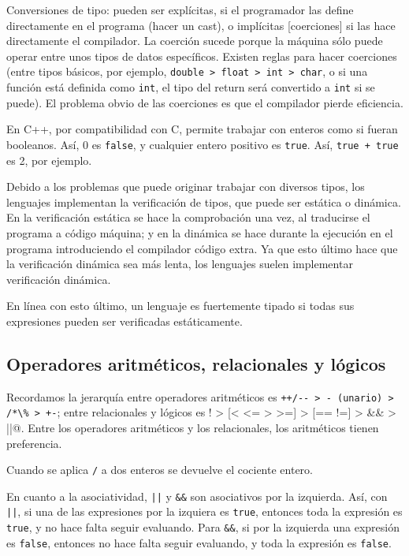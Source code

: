 \documentclass[a4paper]{article}
\begin{document}
	Conversiones de tipo: pueden ser explícitas, si el programador las define directamente en el programa (hacer un cast), o implícitas [coerciones] si las hace directamente el compilador. La coerción sucede porque la máquina sólo puede operar entre unos tipos de datos específicos. Existen reglas para hacer coerciones (entre tipos básicos, por ejemplo, \verb!double > float > int > char!, o si una función está definida como \verb|int|, el tipo del return será convertido a \verb|int| si se puede). El problema obvio de las coerciones es que el compilador pierde eficiencia.
	
	En C++, por compatibilidad con C, permite trabajar con enteros como si fueran booleanos. Así, 0 es \verb|false|, y cualquier entero positivo es \verb|true|. Así, \verb|true + true| es 2, por ejemplo.
	
	Debido a los problemas que puede originar trabajar con diversos tipos, los lenguajes implementan la verificación de tipos, que puede ser estática o dinámica. En la verificación estática se hace la comprobación una vez, al traducirse el programa a código máquina; y en la dinámica se hace durante la ejecución en el programa introduciendo el compilador código extra. Ya que esto último hace que la verificación dinámica sea más lenta, los lenguajes suelen implementar verificación dinámica. 
	
	En línea con esto último, un lenguaje es fuertemente tipado si todas sus expresiones pueden ser verificadas estáticamente.
	
	
	\subsection{Operadores aritméticos, relacionales y lógicos}
	Recordamos la jerarquía entre operadores aritméticos es \verb|++/-- > - (unario) > /*\% > +-|; entre relacionales y lógicos es \verb@! > [< <= > >=] > [== !=] > && > ||@. Entre los operadores aritméticos y los relacionales, los aritméticos tienen preferencia.
	
	Cuando se aplica \verb|/| a dos enteros se devuelve el cociente entero.
	
	En cuanto a la asociatividad, \verb!||! y \verb!&&! son asociativos por la izquierda. Así, con \verb!||!, si una de las expresiones por la izquiera es \verb|true|, entonces toda la expresión es \verb|true|, y no hace falta seguir evaluando. Para \verb|&&|, si por la izquierda una expresión es \verb|false|, entonces no hace falta seguir evaluando, y toda la expresión es \verb|false|.
	
\end{document}
